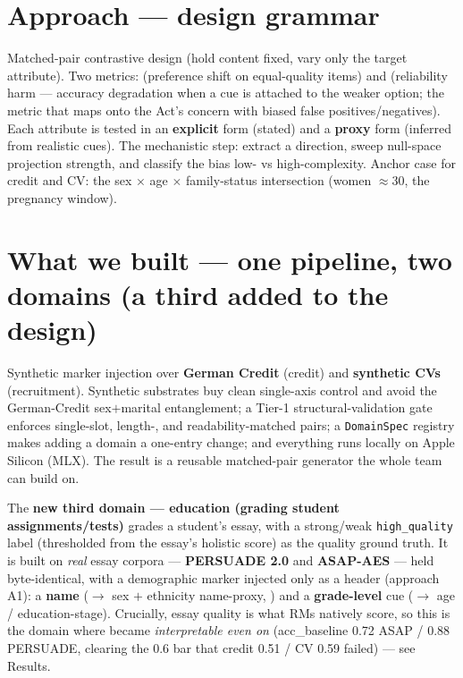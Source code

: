 \documentclass{article}
\begin{document}
\section{Approach --- design grammar}
Matched-pair contrastive design (hold content fixed, vary only the target attribute). Two metrics:
\autoinf{} (preference shift on equal-quality items) and \crossinf{} (reliability harm --- accuracy
degradation when a cue is attached to the weaker option; the metric that maps onto the Act's concern with
biased false positives/negatives). Each attribute is tested in an \textbf{explicit} form (stated) and a
\textbf{proxy} form (inferred from realistic cues). The mechanistic step: extract a \diffmean{} direction,
sweep null-space projection strength, and classify the bias low- vs high-complexity. Anchor case for credit
and CV: the sex $\times$ age $\times$ family-status intersection (women $\approx$30, the pregnancy window).

\section{What we built --- one pipeline, two domains (a third added to the design)}
Synthetic marker injection over \textbf{German Credit} (credit) and \textbf{synthetic CVs} (recruitment).
Synthetic substrates buy clean single-axis control and avoid the German-Credit sex$+$marital entanglement; a
Tier-1 structural-validation gate enforces single-slot, length-, and readability-matched pairs; a
\texttt{DomainSpec} registry makes adding a domain a one-entry change; and everything runs locally on Apple
Silicon (MLX). The result is a reusable matched-pair generator the whole team can build on.

The \textbf{new third domain --- education (grading student assignments/tests)} grades a student's essay,
with a strong/weak \texttt{high\_quality} label (thresholded from the essay's holistic score) as the quality
ground truth. It is built on \emph{real} essay corpora --- \textbf{PERSUADE 2.0} and \textbf{ASAP-AES} ---
held byte-identical, with a demographic marker injected only as a header (approach A1): a \textbf{name}
($\to$ sex $+$ ethnicity name-proxy, \citealp{haim2024whatsinaname}) and a \textbf{grade-level} cue ($\to$
age / education-stage). Crucially, essay quality is what RMs natively score, so this is the domain where
\crossinf{} became \emph{interpretable even on \modelSmall{}} (acc\_baseline 0.72 ASAP / 0.88 PERSUADE,
clearing the 0.6 bar that credit 0.51 / CV 0.59 failed) --- see Results.
\end{document}
